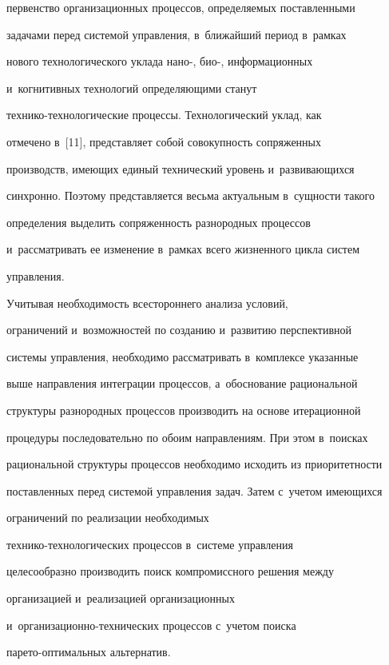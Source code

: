 первенство организационных процессов, определяемых поставленными 


задачами перед системой управ\-ле\-ния, в~ближайший период в~рамках 


нового технологического уклада нано-, био-, информационных 


и~когнитивных технологий определяющими станут  


тех\-ни\-ко-тех\-но\-ло\-ги\-че\-ские процессы. Технологический уклад, как 


отмечено в~[11], представляет собой совокупность сопряженных 


производств, имеющих единый технический уровень и~развивающихся 


синхронно. Поэтому представляется весьма актуальным в~сущности такого 


определения выделить сопряженность разнородных процессов 


и~рассматривать ее изменение в~рамках всего жизненного цикла систем 


управ\-ления.


      


      Учитывая необходимость всестороннего анализа условий, 


ограничений и~возможностей по созданию и~развитию перспективной 


системы управления, необходимо рассматривать в~комплексе указанные 


выше направления интеграции процессов, а~обоснование рациональной 


структуры разнородных процессов производить на основе итерационной 


процедуры последовательно по обоим на\-прав\-ле\-ни\-ям. При этом в~поисках 


рациональной структуры процессов необходимо исходить из приоритетности 


поставленных перед системой управления задач. Затем с~учетом имеющихся 


ограничений по реализации необходимых  


тех\-ни\-ко-тех\-но\-ло\-ги\-че\-ских процессов в~системе управления 


целесообразно производить поиск компромиссного решения между 


организацией и~реализацией организационных  


и~ор\-га\-ни\-за\-ци\-он\-но-тех\-ни\-че\-ских процессов с~учетом поиска  


па\-ре\-то-оп\-ти\-маль\-ных альтернатив.


